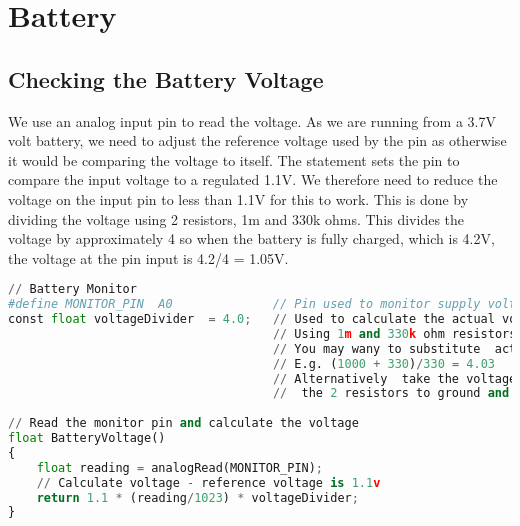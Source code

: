 %
%
%



\chapter{Battery}

\section{Checking the Battery Voltage}

We use an analog input pin to read the voltage. As we are running from a 3.7V volt battery, we need to adjust the reference voltage used by the pin as otherwise it would be comparing the voltage to itself. The statement  sets the pin to compare the input voltage to a regulated 1.1V. We therefore need to reduce the voltage on the input pin to less than 1.1V for this to work. This is done by dividing the voltage using 2 resistors, 1m and 330k ohms. This divides the voltage by approximately 4 so when the battery is fully charged, which is 4.2V, the voltage at the pin input is 4.2/4 = 1.05V. 

\begin{lstlisting}[language=python]
// Battery Monitor
#define MONITOR_PIN  A0              // Pin used to monitor supply voltage
const float voltageDivider  = 4.0;   // Used to calculate the actual voltage fRom the monitor pin reading
                                     // Using 1m and 330k ohm resistors divids the  voltage by approx 4
                                     // You may wany to substitute  actual values of resistors in an equation (R1 + R2)/R2
                                     // E.g. (1000 + 330)/330 = 4.03
                                     // Alternatively  take the voltage reading across the battery and from the joint between 
                                     //  the 2 resistors to ground and divide one by the other to get the value.
    
// Read the monitor pin and calculate the voltage 
float BatteryVoltage()
{ 
    float reading = analogRead(MONITOR_PIN); 
    // Calculate voltage - reference voltage is 1.1v 
    return 1.1 * (reading/1023) * voltageDivider; 
} 
\end{lstlisting}

